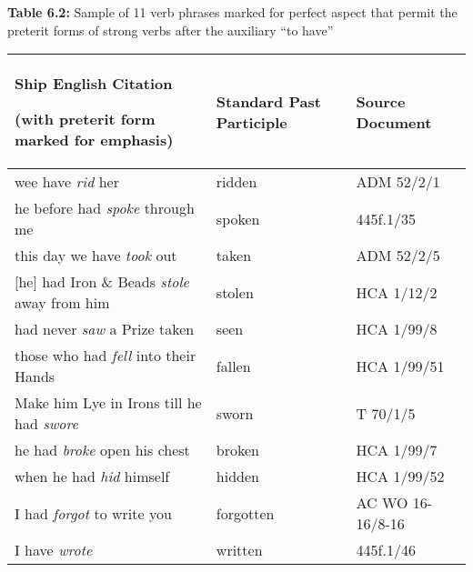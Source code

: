 \begin{styleStandard}
\textbf{Table 6.2:} Sample of 11 verb phrases marked for perfect aspect that permit the preterit forms of strong verbs after the auxiliary “to have”
\end{styleStandard}

\begin{flushleft}
\tablefirsthead{}
\tablehead{}
\tabletail{}
\tablelasttail{}
\begin{supertabular}{m{3.10526in}m{1.0941598in}m{1.5761598in}}
\hline
\textbf{Ship English Citation }

(with preterit form marked for emphasis) &
\textbf{Standard Past Participle} &
\textbf{Source Document}\\\hline
wee have \textit{rid} her &
ridden &
ADM 52/2/1\\
he before had\textit{ spoke} through me  &
spoken &
445f.1/35\\
this day we have \textit{took} out &
taken &
ADM 52/2/5\\
{}[he] had Iron \& Beads \textit{stole} away from him  &
stolen &
HCA 1/12/2\\
had never \textit{saw} a Prize taken &
seen &
HCA 1/99/8\\
those who had \textit{fell} into their Hands  &
fallen &
HCA 1/99/51\\
Make him Lye in Irons till he had \textit{swore} &
sworn &
T 70/1/5\\
he had \textit{broke }open his chest  &
broken &
HCA 1/99/7\\
when he had \textit{hid} himself &
hidden &
HCA 1/99/52\\
I had \textit{forgot} to write you &
forgotten &
AC WO 16-16/8-16\\
I have \textit{wrote} &
written &
445f.1/46\\\hline
\end{supertabular}
\end{flushleft}
